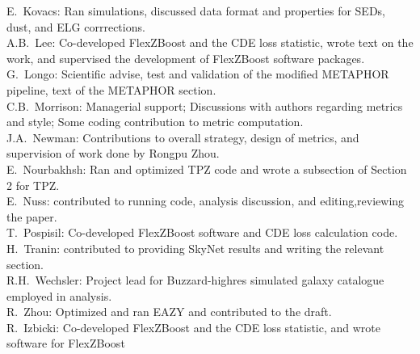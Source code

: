 E.~Kovacs: Ran simulations, discussed data format and properties for SEDs, dust, and ELG corrrections. \\
A.B.~Lee: Co-developed FlexZBoost and the CDE loss statistic, wrote text on the work, and supervised the development of FlexZBoost software packages. \\
G.~Longo: Scientific advise, test and validation of the modified METAPHOR pipeline, text of the METAPHOR section. \\
C.B.~Morrison: Managerial support; Discussions with authors regarding metrics and style; Some coding contribution to metric computation. \\
J.A.~Newman: Contributions to overall strategy, design of metrics, and supervision of work done by Rongpu Zhou. \\
E.~Nourbakhsh: Ran and optimized TPZ code and wrote a subsection of Section 2 for TPZ. \\
E.~Nuss: contributed to running code, analysis discussion, and editing,reviewing the paper. \\
T.~Pospisil: Co-developed FlexZBoost software and CDE loss calculation code. \\
H.~Tranin: contributed to providing SkyNet results and writing the relevant section. \\
R.H.~Wechsler: Project lead for Buzzard-highres simulated galaxy catalogue employed in analysis. \\
R.~Zhou: Optimized and ran EAZY and contributed to the draft. \\
R.~Izbicki: Co-developed FlexZBoost and the CDE loss statistic, and wrote software for FlexZBoost \\
